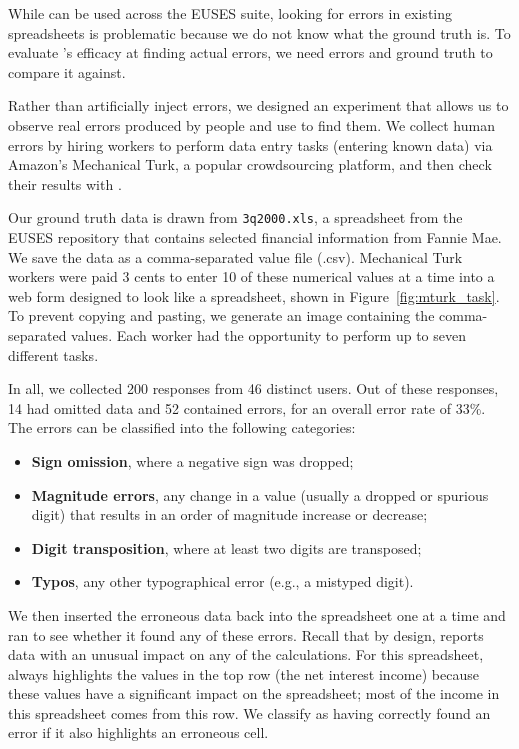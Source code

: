 While \checkcell{} can be used across the EUSES suite, looking for
errors in existing spreadsheets is problematic because we do not know
what the ground truth is. To evaluate \checkcell{}'s efficacy at
finding actual errors, we need errors and ground truth to compare it
against.

Rather than artificially inject errors, we designed an experiment that
allows us to observe real errors produced by people and use
\checkcell{} to find them. We collect human errors by hiring workers
to perform data entry tasks (entering known data) via Amazon's
Mechanical Turk, a popular crowdsourcing platform, and then check
their results with \checkcell{}.

Our ground truth data is drawn from \texttt{3q2000.xls}, a
spreadsheet from the EUSES repository that contains selected financial
information from Fannie Mae. We save the data as a comma-separated
value file (.csv). Mechanical Turk workers were paid 3 cents to
enter 10 of these numerical values at a time into a web form designed to look
like a spreadsheet, shown in Figure~\ref{fig:mturk_task}. To prevent
copying and pasting, we generate an image containing the
comma-separated values. Each worker had the opportunity to perform up
to seven different tasks.

In all, we collected 200 responses from 46 distinct users. Out of
these responses, 14 had omitted data and 52 contained errors, for an
overall error rate of 33\%. The errors can be classified into the following categories:

\begin{itemize}
\item \textbf{Sign omission}, where a negative sign was dropped;
\item \textbf{Magnitude errors}, any change in a value (usually a dropped or spurious digit) that results in an order of magnitude increase or decrease;
\item \textbf{Digit transposition}, where at least two digits are transposed;
\item \textbf{Typos}, any other typographical error (e.g., a mistyped digit).
\end{itemize}

We then inserted the erroneous data back into the spreadsheet one at a
time and ran \checkcell{} to see whether it found any of these
errors. Recall that by design, \checkcell{} reports data with an
unusual impact on any of the calculations. For this
spreadsheet, \checkcell{} always highlights the values in the top row
(the net interest income) because these values have a significant
impact on the spreadsheet; most of the income in this spreadsheet
comes from this row. We classify \checkcell{} as having correctly
found an error if it also highlights an erroneous cell.

